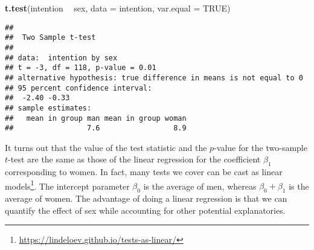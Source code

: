 \documentclass[
]{book}
\newenvironment{Shaded}{\begin{snugshade}}{\end{snugshade}}
\newcommand{\DataTypeTok}[1]{\textcolor[rgb]{0.13,0.29,0.53}{#1}}
\newcommand{\KeywordTok}[1]{\textcolor[rgb]{0.13,0.29,0.53}{\textbf{#1}}}
\newcommand{\NormalTok}[1]{#1}
\newcommand{\OperatorTok}[1]{\textcolor[rgb]{0.81,0.36,0.00}{\textbf{#1}}}
\newcommand{\OtherTok}[1]{\textcolor[rgb]{0.56,0.35,0.01}{#1}}
\newcommand{\StringTok}[1]{\textcolor[rgb]{0.31,0.60,0.02}{#1}}
\renewcommand{\href}[2]{#2\footnote{\url{#1}}}
\begin{document}
\begin{Shaded}
\begin{Highlighting}[]
\KeywordTok{t.test}\NormalTok{(intention }\OperatorTok{~}\StringTok{ }\NormalTok{sex, }\DataTypeTok{data =}\NormalTok{ intention, }\DataTypeTok{var.equal =} \OtherTok{TRUE}\NormalTok{)}
\end{Highlighting}
\end{Shaded}

\begin{verbatim}
## 
##  Two Sample t-test
## 
## data:  intention by sex
## t = -3, df = 118, p-value = 0.01
## alternative hypothesis: true difference in means is not equal to 0
## 95 percent confidence interval:
##  -2.40 -0.33
## sample estimates:
##   mean in group man mean in group woman 
##                 7.6                 8.9
\end{verbatim}

It turns out that the value of the test statistic and the \(p\)-value for the two-sample \(t\)-test are the same as those of the linear regression for the coefficient \(\beta_1\) corresponding to women. \href{https://lindeloev.github.io/tests-as-linear/}{In fact, many tests we cover can be cast as linear models}. The intercept parameter \(\beta_0\) is the average of men, whereas \(\beta_0+\beta_1\) is the average of women. The advantage of doing a linear regression is that we can quantify the effect of sex while accounting for other potential explanatories.

  
\end{document}
